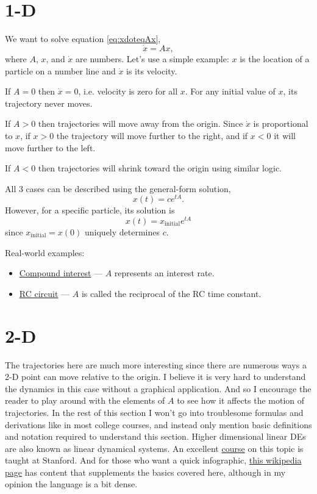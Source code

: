 \documentclass[11pt, oneside]{article}   	%
\begin{document}
\section{1-D}

We want to solve equation \ref*{eq:xdoteqAx},
$$\dot{x} = Ax,$$
where $A$, $x$, and $\dot{x}$ are numbers.
Let's use a simple example: $x$ is the location of a particle on a number line and $\dot{x}$ is its velocity.

If $A = 0$ then $\dot{x} = 0$, i.e. velocity is zero for all $x$.
For any initial value of $x$, its trajectory never moves.

If $A > 0$ then trajectories will move away from the origin.
Since $\dot{x}$ is proportional to $x$,
if $x > 0$ the trajectory will move further to the right, and if $x < 0$ it will move further to the left.

If $A < 0$ then trajectories will shrink toward the origin using similar logic.

All 3 cases can be described using the general-form solution,
\begin{equation}
  x(t) = ce^{tA} .
\end{equation}
However, for a specific particle, its solution is
\begin{equation} \label{eq:1Dsol}
  x(t) = x_\mathrm{initial} e^{tA}
\end{equation}
since $x_\mathrm{initial} = x(0)$ uniquely determines $c$.

Real-world examples:
\begin{itemize}
  \item \href{https://en.wikipedia.org/wiki/Compound_interest#Continuous_compounding}{Compound interest} --- $A$ represents an interest rate.
  \item \href{https://en.wikipedia.org/wiki/RC_circuit#Natural_response}{RC circuit} --- $A$ is called the reciprocal of the RC time constant.
\end{itemize}

\section{2-D}

The trajectories here are much more interesting since there are numerous ways a 2-D point can move relative to the origin.
I believe it is very hard to understand the dynamics in this case without a graphical application.
And so I encourage the reader to play around with the elements of $A$ to see how it affects the motion of trajectories.
In the rest of this section I won't go into troublesome formulas and derivations like in most college courses,
and instead only mention basic definitions and notation required to understand this section.
Higher dimensional linear DEs are also known as linear dynamical systems.
An excellent \href{https://see.stanford.edu/Course/EE263}{course} on this topic is taught at Stanford.
And for those who want a quick infographic,
\href{https://en.wikipedia.org/wiki/Stability_theory}{this wikipedia page} has content that supplements the basics covered here,
although in my opinion the language is a bit dense.
\end{document}
